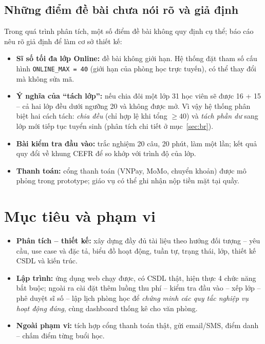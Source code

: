 \subsection{Những điểm đề bài chưa nói rõ và giả định}
Trong quá trình phân tích, một số điểm đề bài không quy định cụ thể; báo cáo nêu rõ giả định để làm cơ sở thiết kế:
\begin{itemize}
  \item \textbf{Sĩ số tối đa lớp Online:} đề bài không giới hạn. Hệ thống đặt tham số cấu hình \texttt{ONLINE\_MAX = 40} (giới hạn của phòng học trực tuyến), có thể thay đổi mà không sửa mã.
  \item \textbf{Ý nghĩa của “tách lớp”:} nếu chia đôi một lớp 31 học viên sẽ được 16 + 15 – cả hai lớp đều dưới ngưỡng 20 và không được mở. Vì vậy hệ thống phân biệt hai cách tách: \emph{chia đều} (chỉ hợp lệ khi tổng $\geq 40$) và \emph{tách phần dư} sang lớp mới tiếp tục tuyển sinh (phân tích chi tiết ở mục~\ref{sec:br}).
  \item \textbf{Bài kiểm tra đầu vào:} trắc nghiệm 20 câu, 20 phút, làm một lần; kết quả quy đổi về khung CEFR \cite{cefr} để so khớp với trình độ của lớp.
  \item \textbf{Thanh toán:} cổng thanh toán (VNPay, MoMo, chuyển khoản) được mô phỏng trong prototype; giáo vụ có thể ghi nhận nộp tiền mặt tại quầy.
\end{itemize}

\section{Mục tiêu và phạm vi}
\begin{itemize}
  \item \textbf{Phân tích – thiết kế:} xây dựng đầy đủ tài liệu theo hướng đối tượng – yêu cầu, use case và đặc tả, biểu đồ hoạt động, tuần tự, trạng thái, lớp, thiết kế CSDL và kiến trúc.
  \item \textbf{Lập trình:} ứng dụng web chạy được, có CSDL thật, hiện thực 4 chức năng bắt buộc; ngoài ra cài đặt thêm luồng thu phí – kiểm tra đầu vào – xếp lớp – phê duyệt sĩ số – lập lịch phòng học để \emph{chứng minh các quy tắc nghiệp vụ hoạt động đúng}, cùng dashboard thống kê cho văn phòng.
  \item \textbf{Ngoài phạm vi:} tích hợp cổng thanh toán thật, gửi email/SMS, điểm danh – chấm điểm từng buổi học.
\end{itemize}

